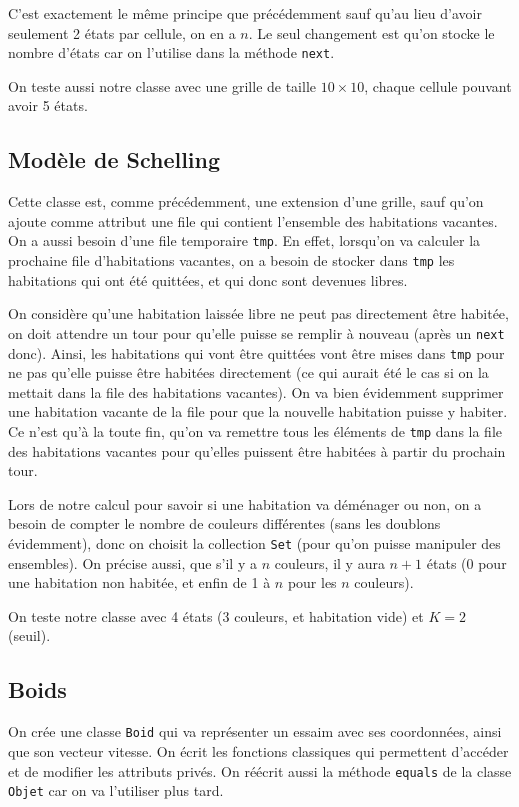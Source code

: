 \documentclass[a4paper, 11pt, french]{article}
\begin{document}
C'est exactement le même principe que précédemment sauf qu'au lieu d'avoir seulement 2 états par cellule, on en a $n$. Le seul changement est qu'on stocke le nombre d'états car on l'utilise dans la méthode \verb|next|.

On teste aussi notre classe avec une grille de taille $10 \times 10$, chaque cellule pouvant avoir 5 états.

\subsection{Modèle de Schelling}

Cette classe est, comme précédemment, une extension d'une grille, sauf qu'on ajoute comme attribut une file qui contient l'ensemble des habitations vacantes. On a aussi besoin d'une file temporaire \verb|tmp|. En effet, lorsqu'on va calculer la prochaine file d'habitations vacantes, on a besoin de stocker dans \verb|tmp| les habitations qui ont été quittées, et qui donc sont devenues libres.

On considère qu'une habitation laissée libre ne peut pas directement être habitée, on doit attendre un tour pour qu'elle puisse se remplir à nouveau (après un \verb|next| donc). Ainsi, les habitations qui vont être quittées vont être mises dans \verb|tmp| pour ne pas qu'elle puisse être habitées directement (ce qui aurait été le cas si on la mettait dans la file des habitations vacantes). On va bien évidemment supprimer une habitation vacante de la file pour que la nouvelle habitation puisse y habiter. Ce n'est qu'à la toute fin, qu'on va remettre tous les éléments de \verb|tmp| dans la file des habitations vacantes pour qu'elles puissent être habitées à partir du prochain tour.

Lors de notre calcul pour savoir si une habitation va déménager ou non, on a besoin de compter le nombre de couleurs différentes (sans les doublons évidemment), donc on choisit la collection \verb|Set| (pour qu'on puisse manipuler des ensembles). On précise aussi, que s'il y a $n$ couleurs, il y aura $n+1$ états (0 pour une habitation non habitée, et enfin de 1 à $n$ pour les $n$ couleurs).

On teste notre classe avec 4 états (3 couleurs, et habitation vide) et $K=2$  (seuil).

\subsection{Boids}

On crée une classe \verb|Boid| qui va représenter un essaim avec ses coordonnées, ainsi que son vecteur vitesse. On écrit les fonctions classiques qui permettent d'accéder et de modifier les attributs privés. On réécrit aussi la méthode \verb|equals| de la classe \verb|Objet| car on va l'utiliser plus tard.
\end{document}
